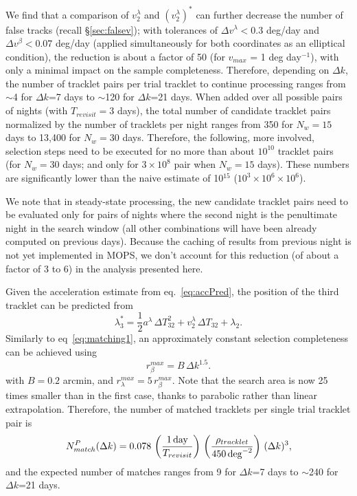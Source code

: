 We find that a comparison of $v_2^\lambda$ and $(v^\lambda_2)^\ast$ can further decrease 
the number of false tracks (recall \S\ref{sec:falsev}); with tolerances of $\Delta v^\lambda < 0.3$ deg/day and 
$\Delta v^\beta < 0.07$ deg/day (applied simultaneously for both coordinates as an 
elliptical condition), the reduction is about a factor of 50 (for $v_{max}$ = 1 deg day$^{-1}$), 
with only a minimal impact on the sample completeness. Therefore, depending on $\Delta k$, the number of tracklet
pairs per trial tracklet  to continue processing ranges from $\sim$4 for $\Delta k$=7 days to 
$\sim$120 for $\Delta k$=21 days. When added over all possible pairs of nights (with 
$T_{revisit}=3$ days), the total number of candidate tracklet pairs normalized by 
the number of tracklets per night ranges from 350 for $N_w=15$ days to 13,400 for $N_w=30$ days.
Therefore, the following, more involved, selection steps need to be executed for 
no more than about $10^{10}$ tracklet pairs (for $N_w=30$ days; and only for $3\times10^{8}$
pair when $N_w=15$ days). These numbers are significantly lower than the naive estimate of 
10$^{15}$ ($10^3\times10^6\times10^6$). 

We note that in steady-state processing, the new candidate tracklet pairs need to 
be evaluated only for pairs of nights where the second night is the penultimate 
night in the search window (all other combinations will have been already computed 
on previous days). Because the caching of results from previous night is not
yet implemented in MOPS, we don't account for this reduction (of about a factor of 
3 to 6) in the analysis presented here. 

Given the acceleration estimate from eq.~\ref{eq:accPred}, the position of the third
tracklet can be predicted from 
\begin{equation}
\label{eq:lambdaPred3}
  \lambda_3^\ast = \frac{1}{2} a^\lambda \, \Delta T_{32}^2 + v_2^\lambda \, \Delta T_{32} + \lambda_2.   
\end{equation}
Similarly to eq~\ref{eq:matching1}, an approximately constant selection completeness 
can be achieved using
\begin{equation}
\label{eq:matching2} 
                r_\beta^{max} = B \, \Delta k^{1.5}.
\end{equation}
with $B=0.2$ arcmin, and $r_\lambda^{max} = 5 \, r_\beta^{max}$. Note that the search
area is now 25 times smaller than in the first case, thanks to parabolic rather
than linear extrapolation. Therefore, the number of matched tracklets per single 
trial tracklet pair is
\begin{equation}
\label{eq:Nmdk3}
     N^P_{match}(\Delta k) = 0.078 \, \left({1 \, {\rm day} \over T_{revisit}}\right) \, 
                    \left( \rho_{tracklet}  \over 450 \, {\rm deg}^{-2} \right) \, (\Delta k)^3, 
\end{equation}
and the expected number of matches ranges from 9 for $\Delta k$=7 days to
$\sim$240 for $\Delta k$=21 days. 

